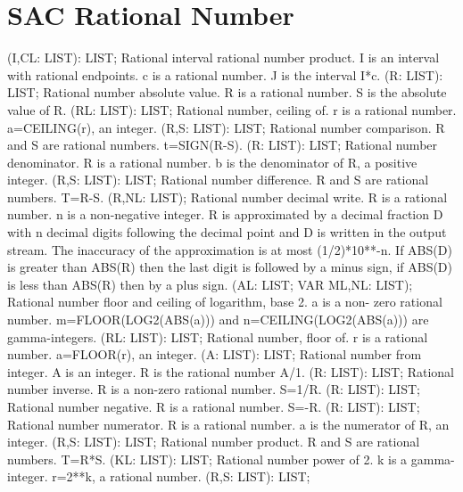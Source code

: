 \section{ SAC Rational Number  } 
 (I,CL: LIST): LIST; \eproc
\bcom Rational interval rational number product. I is an interval with
rational endpoints. c is a rational number. J is the interval I*c. \ecom 
{} (R: LIST): LIST; \eproc
\bcom Rational number absolute value. R is a rational number. S is the
absolute value of R. \ecom 
{} (RL: LIST): LIST; \eproc
\bcom Rational number, ceiling of. r is a rational number. a=CEILING(r),
an integer. \ecom 
{} (R,S: LIST): LIST; \eproc
\bcom Rational number comparison. R and S are rational numbers.
t=SIGN(R-S). \ecom 
{} (R: LIST): LIST; \eproc
\bcom Rational number denominator. R is a rational number. b is the
denominator of R, a positive integer. \ecom 
{} (R,S: LIST): LIST; \eproc
\bcom Rational number difference. R and S are rational numbers. T=R-S. \ecom 
{} (R,NL: LIST); \eproc
\bcom Rational number decimal write. R is a rational number. n is a
non-negative integer.  R is approximated by a decimal fraction D with
n decimal digits following the decimal point and D is written in the
output stream.  The inaccuracy of the approximation is at most
(1/2)*10**-n.  If ABS(D) is greater than ABS(R) then the last digit is
followed by a minus sign, if ABS(D) is less than ABS(R) then by a
plus sign. \ecom 
{} (AL: LIST; VAR ML,NL: LIST); \eproc
\bcom Rational number floor and ceiling of logarithm, base 2. a is a non-
zero rational number.  m=FLOOR(LOG2(ABS(a))) and n=CEILING(LOG2(ABS(a))) 
are gamma-integers. \ecom 
{} (RL: LIST): LIST; \eproc
\bcom Rational number, floor of. r is a rational number. a=FLOOR(r),
an integer. \ecom 
{} (A: LIST): LIST; \eproc
\bcom Rational number from integer. A is an integer. R is the rational
number A/1. \ecom 
{} (R: LIST): LIST; \eproc
\bcom Rational number inverse. R is a non-zero rational number. S=1/R. \ecom 
{} (R: LIST): LIST; \eproc
\bcom Rational number negative. R is a rational number. S=-R. \ecom 
{} (R: LIST): LIST; \eproc
\bcom Rational number numerator. R is a rational number. a is the
numerator of R, an integer. \ecom 
{} (R,S: LIST): LIST; \eproc
\bcom Rational number product. R and S are rational numbers. T=R*S. \ecom 
{} (KL: LIST): LIST; \eproc
\bcom Rational number power of 2. k is a gamma-integer. r=2**k, a
rational number. \ecom 
{} (R,S: LIST): LIST; \eproc
